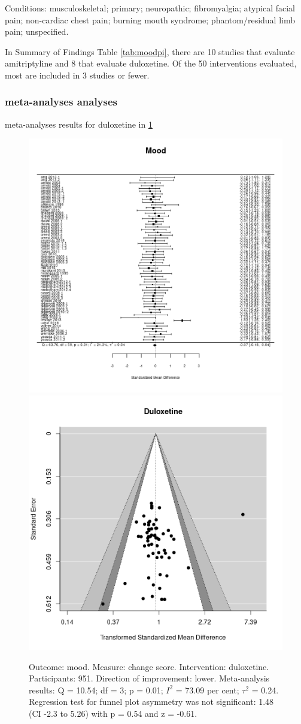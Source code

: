 \documentclass{report}\usepackage[]{graphicx}\usepackage[]{color}
\newenvironment{knitrout}{}{} %
\begin{document}
Conditions: musculoskeletal; primary; neuropathic; fibromyalgia; atypical facial pain; non-cardiac chest pain; burning mouth syndrome; phantom/residual limb pain; unspecified.

In Summary of Findings Table \ref{tab:moodpi}, there are 10 studies that evaluate amitriptyline and 8 that evaluate duloxetine. Of the 50 interventions evaluated, most are included in 3 studies or fewer.

\subsubsection{meta-analyses analyses}

meta-analyses results for duloxetine in \ref{fig:mood-cs-dulox}

\begin{figure}

\begin{knitrout}
\color{fgcolor}
\includegraphics[width=0.5\linewidth,height=0.35\textheight]{img/mood-change_score-duloxetine- - -forest} 
\includegraphics[width=0.5\linewidth,height=0.35\textheight]{img/mood-change_score-duloxetine- - -funnel} 
\end{knitrout}

\caption[Mood: duloxetine]{Outcome: mood. Measure: change score. Intervention: duloxetine. Participants: 951. Direction of improvement: lower. Meta-analysis results: Q = 10.54; df = 3; p = 0.01; $I^2$ = 73.09 per cent; $\tau^2$ = 0.24. Regression test for funnel plot asymmetry was not significant: 1.48 (CI -2.3 to 5.26) with p = 0.54 and z = -0.61.}
\label{fig:mood-cs-dulox}
\end{figure}
\end{document}
